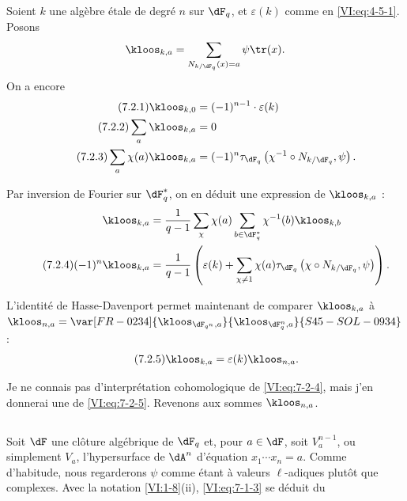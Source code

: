 \subsection{}\label{VI:7-2}

Soient $k$ une algèbre étale de degré $n$ sur $\dF_q$, et $\varepsilon(k)$ 
comme en \eqref{VI:eq:4-5-1}. Posons 
\[
  \kloos_{k,a} = \sum_{N_{k/\dF_q}(x)=a} \psi \tr(x) \text{.} 
\]
On a encore 
\begin{align*}\tag{7.2.1}\label{VI:eq:7-2-1}
  \kloos_{k,0} &= (-1)^{n-1} \cdot \varepsilon(k) \\ \tag{7.2.2}\label{VI:eq:7-2-2}
  \sum_a \kloos_{k,a} &= 0 \\ \tag{7.2.3}\label{VI:eq:7-2-3}
  \sum_a \chi(a) \kloos_{k,a} &= (-1)^n \tau_{\dF_q}\left(\chi^{-1}\circ N_{k/\dF_q},\psi\right) \text{.} 
\end{align*}

Par inversion de Fourier sur $\dF_q^\ast$, on en déduit une expression de 
$\kloos_{k,a}$ : 
\begin{align*} 
  \kloos_{k,a} &= \frac{1}{q-1} \sum_\chi \chi(a) \sum_{b\in \dF_q^\ast} \chi^{-1}(b) \kloos_{k,b} \\ \tag{7.2.4}\label{VI:eq:7-2-4}
  (-1)^n \kloos_{k,a} &= \frac{1}{q-1} \left(\varepsilon(k) + \sum_{\chi\ne 1} \chi(a) \tau_{\dF_q}\left(\chi\circ N_{k/\dF_q},\psi\right) \right) \text{.} 
\end{align*}

L'identité de Hasse-Davenport permet maintenant de comparer $\kloos_{k,a}$ 
à $\kloos_{n,a} = \var[FR-0234]{\kloos_{\dF_{q^n},a}}{\kloos_{\dF_q^n,a}}{S45-SOL-0934}$: 
\begin{equation*}\tag{7.2.5}\label{VI:eq:7-2-5}
  \kloos_{k,a} = \varepsilon(k) \kloos_{n,a} \text{.} 
\end{equation*}

Je ne connais pas d'interprétation cohomologique de \eqref{VI:eq:7-2-4}, mais 
j'en donnerai une de \eqref{VI:eq:7-2-5}. Revenons aux sommes $\kloos_{n,a}$. 





\subsection{}\label{VI:7-3}

Soit $\dF$ une clôture algébrique de $\dF_q$ et, pour $a\in \dF$, soit 
$V_a^{n-1}$, ou simplement $V_a$, l'hypersurface de $\dA^n$ d'équation 
$x_1 \dotsm x_n=a$. Comme d'habitude, nous regarderons $\psi$ comme étant à 
valeurs $\ell$-adiques plutôt que complexes. Avec la notation 
\ref{VI:1-8}(ii), \eqref{VI:eq:7-1-3} se déduit du 





